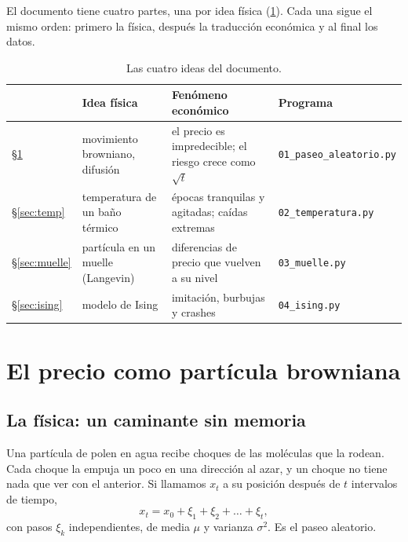 \documentclass[11pt,a4paper]{article}
\begin{document}
El documento tiene cuatro partes, una por idea física (\cref{tab:plan}). Cada una sigue el mismo orden:
primero la física, después la traducción económica y al final los datos.

\begin{table}[ht]
\centering\small
\caption{Las cuatro ideas del documento.}
\label{tab:plan}
\begin{tabular}{@{}l>{\raggedright\arraybackslash}p{3.6cm}>{\raggedright\arraybackslash}p{5.0cm}>{\raggedright\arraybackslash}p{3.9cm}@{}}
\toprule
& Idea física & Fenómeno económico & Programa \\
\midrule
\S\ref{sec:paseo} & movimiento browniano, difusión & el precio es impredecible; el riesgo crece como $\sqrt t$ & \texttt{01\_paseo\_aleatorio.py}\\
\S\ref{sec:temp} & temperatura de un baño térmico & épocas tranquilas y agitadas; caídas extremas & \texttt{02\_temperatura.py}\\
\S\ref{sec:muelle} & partícula en un muelle (Langevin) & diferencias de precio que vuelven a su nivel & \texttt{03\_muelle.py}\\
\S\ref{sec:ising} & modelo de Ising & imitación, burbujas y crashes & \texttt{04\_ising.py}\\
\bottomrule
\end{tabular}
\end{table}

\section{El precio como partícula browniana}
\label{sec:paseo}

\subsection{La física: un caminante sin memoria}

Una partícula de polen en agua recibe choques de las moléculas que la rodean. Cada choque la empuja un poco
en una dirección al azar, y un choque no tiene nada que ver con el anterior. Si llamamos $x_t$ a su posición
después de $t$ intervalos de tiempo,
\begin{equation}
x_t=x_0+\xi_1+\xi_2+\dots+\xi_t ,
\end{equation}
con pasos $\xi_k$ independientes, de media $\mu$ y varianza $\sigma^2$. Es el paseo aleatorio.
\end{document}
